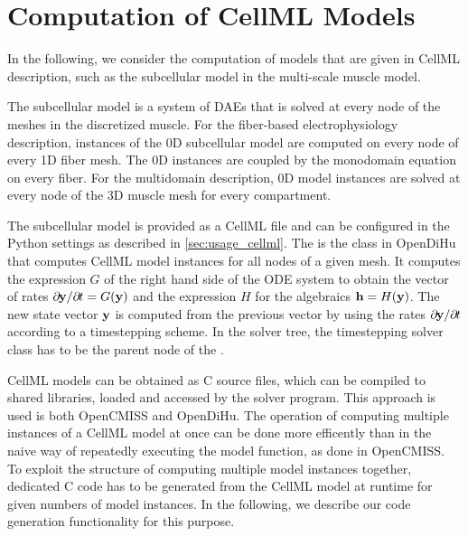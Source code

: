 


\section{Computation of CellML Models}\label{sec:computation_cellml_models}

In the following, we consider the computation of models that are given in CellML description, such as the subcellular model in the multi-scale muscle model.

The subcellular model is a system of DAEs that is solved at every node of the meshes in the discretized muscle.
For the fiber-based electrophysiology description, instances of the 0D subcellular model are computed on every node of every 1D fiber mesh. The 0D instances are coupled by the monodomain equation on every fiber. For the multidomain description, 0D model instances are solved at every node of the 3D muscle mesh for every compartment.

The subcellular model is provided as a CellML file and can be configured in the Python settings as described in \cref{sec:usage_cellml}.
The  is the class in OpenDiHu that computes CellML model instances for all nodes of a given mesh. It computes the expression $G$ of the right hand side of the ODE system to obtain the vector of rates $\partial \bfy / \partial t = G(\bfy)$ and the expression $H$ for the algebraics $\textbf{h}=H(\textbf{y})$. The new state vector $\textbf{y}$ is computed from the previous vector by using the rates $\partial \bfy / \partial t$ according to a timestepping scheme.  In the solver tree, the timestepping solver class has to be the parent node of the .

CellML models can be obtained as C source files, which can be compiled to shared libraries, loaded and accessed by the solver program. This approach is used is both OpenCMISS and OpenDiHu.
The operation of computing multiple instances of a CellML model at once can be done more efficently than in the naive way of repeatedly executing the model function, as done in OpenCMISS. To exploit the structure of computing multiple model instances together, dedicated C code has to be generated from the CellML model at runtime for given numbers of model instances.
In the following, we describe our code generation functionality for this purpose.

